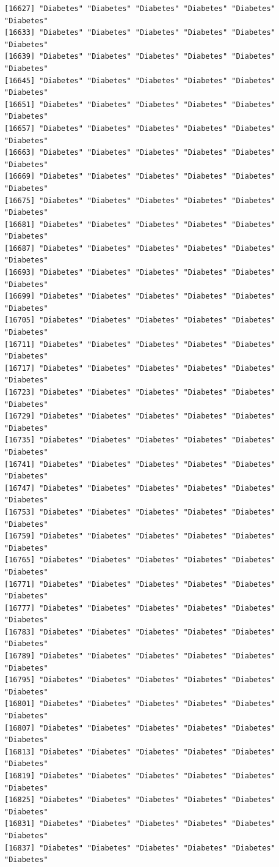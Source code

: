 \documentclass[
  letterpaper,
  DIV=11,
  numbers=noendperiod]{scrartcl}
\begin{document}
\begin{verbatim}
[16627] "Diabetes" "Diabetes" "Diabetes" "Diabetes" "Diabetes" "Diabetes"
[16633] "Diabetes" "Diabetes" "Diabetes" "Diabetes" "Diabetes" "Diabetes"
[16639] "Diabetes" "Diabetes" "Diabetes" "Diabetes" "Diabetes" "Diabetes"
[16645] "Diabetes" "Diabetes" "Diabetes" "Diabetes" "Diabetes" "Diabetes"
[16651] "Diabetes" "Diabetes" "Diabetes" "Diabetes" "Diabetes" "Diabetes"
[16657] "Diabetes" "Diabetes" "Diabetes" "Diabetes" "Diabetes" "Diabetes"
[16663] "Diabetes" "Diabetes" "Diabetes" "Diabetes" "Diabetes" "Diabetes"
[16669] "Diabetes" "Diabetes" "Diabetes" "Diabetes" "Diabetes" "Diabetes"
[16675] "Diabetes" "Diabetes" "Diabetes" "Diabetes" "Diabetes" "Diabetes"
[16681] "Diabetes" "Diabetes" "Diabetes" "Diabetes" "Diabetes" "Diabetes"
[16687] "Diabetes" "Diabetes" "Diabetes" "Diabetes" "Diabetes" "Diabetes"
[16693] "Diabetes" "Diabetes" "Diabetes" "Diabetes" "Diabetes" "Diabetes"
[16699] "Diabetes" "Diabetes" "Diabetes" "Diabetes" "Diabetes" "Diabetes"
[16705] "Diabetes" "Diabetes" "Diabetes" "Diabetes" "Diabetes" "Diabetes"
[16711] "Diabetes" "Diabetes" "Diabetes" "Diabetes" "Diabetes" "Diabetes"
[16717] "Diabetes" "Diabetes" "Diabetes" "Diabetes" "Diabetes" "Diabetes"
[16723] "Diabetes" "Diabetes" "Diabetes" "Diabetes" "Diabetes" "Diabetes"
[16729] "Diabetes" "Diabetes" "Diabetes" "Diabetes" "Diabetes" "Diabetes"
[16735] "Diabetes" "Diabetes" "Diabetes" "Diabetes" "Diabetes" "Diabetes"
[16741] "Diabetes" "Diabetes" "Diabetes" "Diabetes" "Diabetes" "Diabetes"
[16747] "Diabetes" "Diabetes" "Diabetes" "Diabetes" "Diabetes" "Diabetes"
[16753] "Diabetes" "Diabetes" "Diabetes" "Diabetes" "Diabetes" "Diabetes"
[16759] "Diabetes" "Diabetes" "Diabetes" "Diabetes" "Diabetes" "Diabetes"
[16765] "Diabetes" "Diabetes" "Diabetes" "Diabetes" "Diabetes" "Diabetes"
[16771] "Diabetes" "Diabetes" "Diabetes" "Diabetes" "Diabetes" "Diabetes"
[16777] "Diabetes" "Diabetes" "Diabetes" "Diabetes" "Diabetes" "Diabetes"
[16783] "Diabetes" "Diabetes" "Diabetes" "Diabetes" "Diabetes" "Diabetes"
[16789] "Diabetes" "Diabetes" "Diabetes" "Diabetes" "Diabetes" "Diabetes"
[16795] "Diabetes" "Diabetes" "Diabetes" "Diabetes" "Diabetes" "Diabetes"
[16801] "Diabetes" "Diabetes" "Diabetes" "Diabetes" "Diabetes" "Diabetes"
[16807] "Diabetes" "Diabetes" "Diabetes" "Diabetes" "Diabetes" "Diabetes"
[16813] "Diabetes" "Diabetes" "Diabetes" "Diabetes" "Diabetes" "Diabetes"
[16819] "Diabetes" "Diabetes" "Diabetes" "Diabetes" "Diabetes" "Diabetes"
[16825] "Diabetes" "Diabetes" "Diabetes" "Diabetes" "Diabetes" "Diabetes"
[16831] "Diabetes" "Diabetes" "Diabetes" "Diabetes" "Diabetes" "Diabetes"
[16837] "Diabetes" "Diabetes" "Diabetes" "Diabetes" "Diabetes" "Diabetes"

\end{verbatim}
\end{document}
